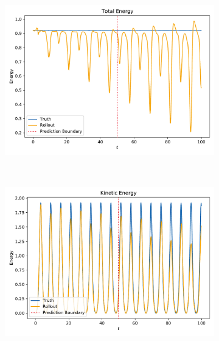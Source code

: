 		\begin{figure}
			\centering
			\begin{subfigure}{0.7\linewidth}
				\includegraphics[width=\linewidth]{figures/results/pendulum/run-latent-dim-10/energy-R10-N0-total.pdf}
			\end{subfigure} \\
			\begin{subfigure}{0.5\linewidth}
				\centering
				\includegraphics[width=\linewidth]{figures/results/pendulum/run-latent-dim-10/energy-R10-N0-kinetic.pdf}
			\end{subfigure}%
			~
			\begin{subfigure}{0.5\linewidth}
				\centering

\end{subfigure}
\end{figure}
